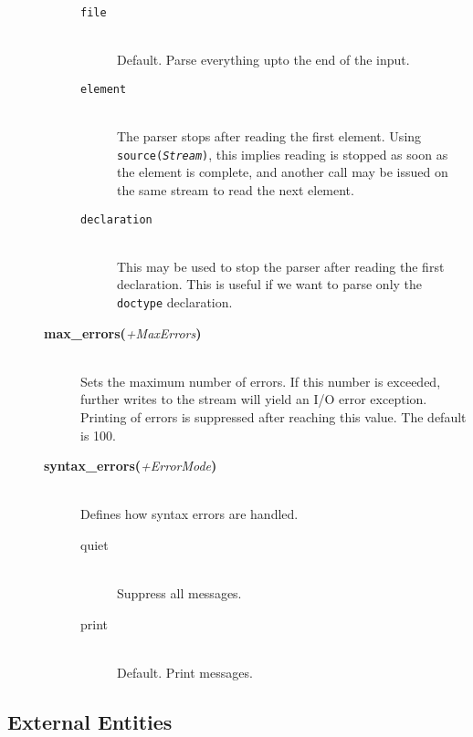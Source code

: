 \begin{description}
\begin{description}
    \begin{description}
    \item[{\tt file}]\mbox{}\\
      Default.  Parse everything upto the end of the input.
    \item[{\tt element}]\mbox{}\\
      The parser stops after reading the first element. Using {\tt source(\emph{Stream})}, this implies reading is stopped as soon as the
      element is complete, and another call may be issued on the same stream
      to read the next element. 

    \item[{\tt declaration}]\mbox{}\\
      This may be used to stop the parser after reading the first
      declaration.  This is useful if we want to parse only the {\tt doctype}
      declaration.
      
    \end{description}

  \item[{\bf max\_errors}{\bf (}{\it +MaxErrors}{\bf )}]\mbox{}\\
    Sets the maximum number of errors. If this number is exceeded, further 
    writes to the stream will yield an I/O error exception. Printing of 
    errors is suppressed after reaching this value. The default is 100. 
  \item[{\bf syntax\_errors}{\bf (}{\it +ErrorMode}{\bf )}]\mbox{}\\
    Defines how syntax errors are handled.

    \begin{description}
    \item[quiet]\mbox{}\\
      Suppress all messages.
    \item[print]\mbox{}\\
      Default.  Print messages.
      
    \end{description}
    

  \end{description}

\end{description}

\subsection{External Entities}


